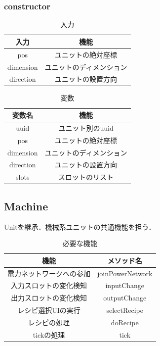 \documentclass[uplatex,dvipdfmx,report]{jlreq}
\begin{document}
\subsubsection{constructor}

\begin{table}[H]
    \centering
    \caption{入力}
    \begin{tabular}{cc}
        \hline
        入力 & 機能 \\
        \hline
        \hline
        pos & ユニットの絶対座標 \\
        dimension & ユニットのディメンション \\
        direction & ユニットの設置方向 \\
        \hline
    \end{tabular}
\end{table}

\begin{table}[H]
    \centering
    \caption{変数}
    \begin{tabular}{cc}
        \hline
        変数名 & 機能 \\
        \hline
        \hline
        uuid & ユニット別のuuid \\
        pos & ユニットの絶対座標 \\
        dimension & ユニットのディメンション \\
        direction & ユニットの設置方向 \\
        slots & スロットのリスト \\
        \hline
    \end{tabular}
\end{table}

\subsection{Machine}

Unitを継承．機械系ユニットの共通機能を担う．

\begin{table}[H]
    \centering
    \caption{必要な機能}
    \begin{tabular}{cc}
        \hline
        機能 & メソッド名 \\
        \hline
        \hline
        電力ネットワークへの参加 & joinPowerNetwork \\
        入力スロットの変化検知 & inputChange \\
        出力スロットの変化検知 & outputChange \\
        レシピ選択UIの実行 & selectRecipe \\
        レシピの処理 & doRecipe \\
        tickの処理 & tick \\
        \hline
    \end{tabular}
\end{table}
\end{document}
